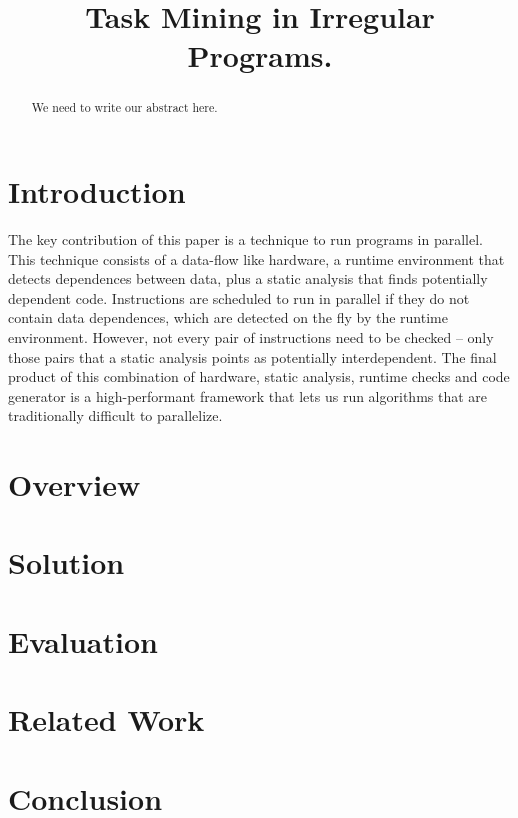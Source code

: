 \documentclass[pageno]{jpaper}
\begin{document}
\title{Task Mining in Irregular Programs.}

\date{}
\maketitle

\thispagestyle{empty}

\begin{abstract}
We need to write our abstract here.
\end{abstract}

\section{Introduction}
\label{sec:intro}

The key contribution of this paper is a technique to run programs in parallel.
This technique consists of a data-flow like hardware,
a runtime environment that detects dependences between data, plus a
static analysis that finds potentially dependent code.
Instructions are scheduled to run in parallel if they do not contain data
dependences, which are detected on the fly by the runtime environment.
However, not every pair of instructions need to be checked -- only those pairs
that a static analysis points as potentially interdependent.
The final product of this combination of hardware, static analysis, runtime checks
and code generator is a high-performant framework that lets us run algorithms that
are traditionally difficult to parallelize.

\section{Overview}
\label{sec:ovf}

\section{Solution}
\label{sec:sol}

\section{Evaluation}
\label{sec:eval}

\section{Related Work}
\label{sec:rw}

\section{Conclusion}
\label{sec:conc}



\end{document}
